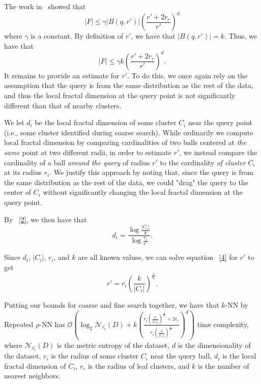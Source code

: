 The work in~\cite{yu2015entropy} showed that \begin{equation} |F| \leq \gamma |B(q, r')|\left(\frac{r'+ 2r_c}{r'}\right)^d \label{3} \end{equation} where $\gamma$ is a constant. 
By definition of 
$r'$, we have that $|B(q, r')| = k$. Thus, we have that \begin{equation} |F| \leq \gamma k\left(\frac{r'+ 2r_c}{r'}\right)^d. \label{4} \end{equation} It remains to provide an estimate for $r'$. 
To do this, we once again rely on the assumption that the query is from the same distribution as the rest of the data, 
and thus the local fractal dimension at the query point is not significantly different than that of nearby clusters.


We let $d_i$ be the local fractal dimension of some cluster $C_i$ near the query point (i.e., some cluster identified during coarse search).
While ordinarily we compute local fractal dimension 
by comparing cardinalities of two balls centered at \emph{the same} point at two different radii, in order to estimate $r'$, 
we instead compare the cardinality of a ball \emph{around the query} of radius $r'$ to the cardinality \emph{of cluster $C_i$} at its radius $r_i$.
We justify this approach by noting that, since the query is from the same distribution as the rest of the data, we could "drag" the query to 
the center of $C_i$ without significantly changing the local fractal dimension at the query point. 


By ~\ref{2}, we then have that \begin{equation} d_i = \frac{\log{}\frac{|C_i|}{k}}{\log{}\frac{r_i}{r'}}. \label{5} \end{equation}

Since $d_i$, $|C_i|$, $r_i$, and $k$ are all known values, we can solve equation ~\ref{4} for $r'$ to get
\begin{equation} r' = r_i\left(\frac{k}{|C_i|}\right)^{\frac{1}{d_i}}. \label{5} \end{equation}
    
Putting our bounds for coarse and fine search together, we have that $k$-NN by Repeated $\rho$-NN has 
$\mathcal{O}\left(\log_2{\mathcal{N}_{\hat{r_c}}(D)} + k\left(\frac{r_i\left(\frac{k}{|C_i|}\right)^{\frac{1}{d_i}}+ 2r_c}{r_i\left(\frac{k}{|C_i|}\right)^{\frac{1}{d_i}}}\right)^d\right)$ 
time complexity, where $\mathcal{N}_{\hat{r_c}}(D)$ is the metric entropy of the dataset, $d$ is the dimensionality of the dataset, $r_i$ is the radius of some cluster $C_i$
near the query ball, $d_i$ is the local fractal dimension of $C_i$, $r_c$ is the radius of leaf clusters, and $k$ is the number of nearest neighbors. 

